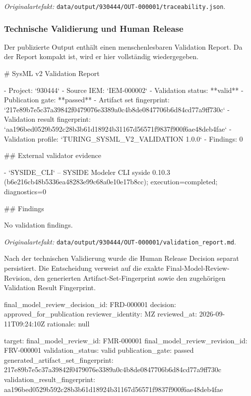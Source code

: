 \noindent\textit{Originalartefakt:}
\texttt{data/output/930444/OUT-000001/traceability.json}.

\subsubsection{Technische Validierung und Human Release}

Der publizierte Output enthält einen menschenlesbaren Validation Report. Da der
Report kompakt ist, wird er hier vollständig wiedergegeben.

\begin{evidencebox}
# SysML v2 Validation Report

- Project: `930444`
- Source IEM: `IEM-000002`
- Validation status: **valid**
- Publication gate: **passed**
- Artifact set fingerprint: `217e89b7e5c37a39842f0479076e3389a0c4b8de0847706b6d84cd77a9ff730c`
- Validation result fingerprint: `aa196bed0529b592c28b3b61d18924b31167d56571f9837f900f6ae48deb4fae`
- Validation profile: `TURING_SYSML_V2_VALIDATION 1.0.0`
- Findings: 0

## External validator evidence

- `SYSIDE_CLI` -- SYSIDE Modeler CLI syside 0.10.3
  (b6e216cb48b5336ea48283e99c68a0e10e17b8cc);
  execution=completed; diagnostics=0

## Findings

No validation findings.
\end{evidencebox}

\noindent\textit{Originalartefakt:}
\texttt{data/output/930444/OUT-000001/validation\_report.md}.

Nach der technischen Validierung wurde die Human Release Decision separat
persistiert. Die Entscheidung verweist auf die exakte Final-Model-Review-
Revision, den generierten Artifact-Set-Fingerprint sowie den zugehörigen
Validation Result Fingerprint.

\begin{evidencebox}
final_model_review_decision_id: FRD-000001
decision:                       approved_for_publication
reviewer_identity:              MZ
reviewed_at:                    2026-09-11T09:24:10Z
rationale:                      null

target:
  final_model_review_id:          FMR-000001
  final_model_review_revision_id: FRV-000001
  validation_status:              valid
  publication_gate:               passed
  generated_artifact_set_fingerprint:
    217e89b7e5c37a39842f0479076e3389a0c4b8de0847706b6d84cd77a9ff730c
  validation_result_fingerprint:
    aa196bed0529b592c28b3b61d18924b31167d56571f9837f900f6ae48deb4fae
\end{evidencebox}

